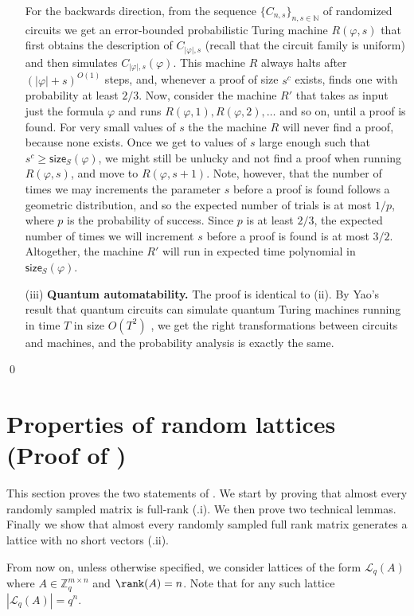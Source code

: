 \documentclass[11pt]{article}
\theoremstyle{definition}
\theoremstyle{plain}
\theoremstyle{remark}
\newcommand{\LL}{\mathcal{L}}
\newcommand{\bZ}{\mathbb{Z}}
\newcommand{\bN}{\mathbb{N}}
\newcommand{\size}[2]{\mathsf{size}_{#1}(#2)}
\begin{document}
\begin{enumerate}
        For the backwards direction, from the sequence $\{ C_{n, s}\}_{n, s \in \bN}$ of randomized circuits we get an error-bounded probabilistic Turing machine $R(\varphi, s)$ that first obtains the description of $C_{|\varphi|, s}$ (recall that the circuit family is uniform) and then simulates $C_{|\varphi|, s}(\varphi)$. This machine $R$ always halts after $(|\varphi| + s)^{O(1)}$ steps, and, whenever a proof of size $s^c$ exists, finds one with probability at least $2/3$. Now, consider the machine $R'$ that takes as input just the formula $\varphi$ and runs $R(\varphi, 1), R(\varphi, 2), \dots$ and so on, until a proof is found. For very small values of $s$ the the machine $R$ will never find a proof, because none exists. Once we get to values of $s$ large enough such that $s^c \geq \size{S}{\varphi}$, we might still be unlucky and not find a proof when running $R(\varphi, s)$, and move to $R(\varphi, s+1)$. Note, however, that the number of times we may increments the parameter $s$ before a proof is found follows a geometric distribution, and so the expected number of trials is at most $1/p$, where $p$ is the probability of success. Since $p$ is at least $2/3$, the expected number of times we will increment $s$ before a proof is found is at most $3/2$. Altogether, the machine $R'$ will run in expected time polynomial in $\size{S}{\varphi}$.
           
        \item[(iii)] \textbf{Quantum automatability.} The proof is identical to (ii). By Yao's result that quantum circuits can simulate quantum Turing machines running in time $T$ in size $O(T^2)$ \cite{yao}, we get the right transformations between circuits and machines, and the probability analysis is exactly the same.
    \end{enumerate} \qed

\section{Properties of random lattices (Proof of )}\label{app:counting}
This section proves the two statements of . We start by proving that almost every randomly sampled matrix is full-rank (.i). We then prove two technical lemmas. Finally we show that almost every randomly sampled full rank matrix generates a lattice with no short vectors (.ii). 

From now on, unless otherwise specified, we consider lattices of the form $\LL_q(A)$ where $A \in \bZ_q^{m \times n}$ and $\rank(A) = n$. Note that for any such lattice $|\LL_q(A)|=q^n$.
\end{document}
